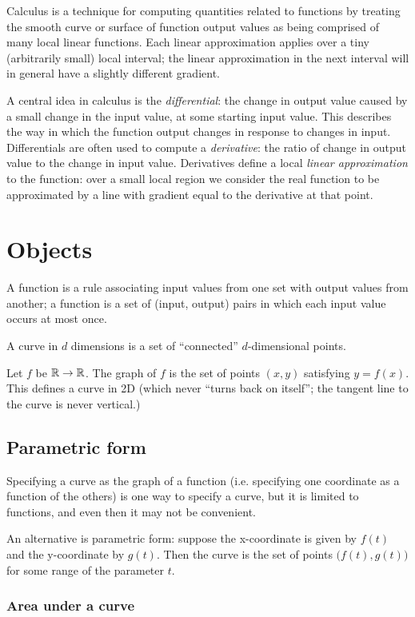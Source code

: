 \documentclass[12pt]{article}
\begin{document}
Calculus is a technique for computing quantities related to functions by
treating the smooth curve or surface of function output values as being
comprised of many local linear functions. Each linear approximation applies
over a tiny (arbitrarily small) local interval; the linear approximation in the
next interval will in general have a slightly different gradient.

A central idea in calculus is the \textit{differential}: the change in output
value caused by a small change in the input value, at some starting input
value. This describes the way in which the function output changes in response
to changes in input. Differentials are often used to compute a
\textit{derivative}: the ratio of change in output value to the change in input
value. Derivatives define a local \textit{linear approximation} to the
function: over a small local region we consider the real function to be
approximated by a line with gradient equal to the derivative at that point.

\section*{Objects}

A function is a rule associating input values from one set with output values
from another; a function is a set of (input, output) pairs in which each input
value occurs at most once.

A curve in $d$ dimensions is a set of ``connected'' $d$-dimensional points.

Let $f$ be $\mathbb{R} \to \mathbb{R}$. The graph of $f$ is the set of points $(x,y)$
satisfying $y = f(x)$. This defines a curve in 2D (which never ``turns back on
itself''; the tangent line to the curve is never vertical.)

\subsection*{Parametric form}

Specifying a curve as the graph of a function (i.e. specifying one coordinate
as a function of the others) is one way to specify a curve, but it is limited
to functions, and even then it may not be convenient.

An alternative is parametric form: suppose the x-coordinate is given by $f(t)$
and the y-coordinate by $g(t)$. Then the curve is the set of points
$\big(f(t), g(t)\big)$ for some range of the parameter $t$.

\subsubsection*{Area under a curve}
\end{document}
